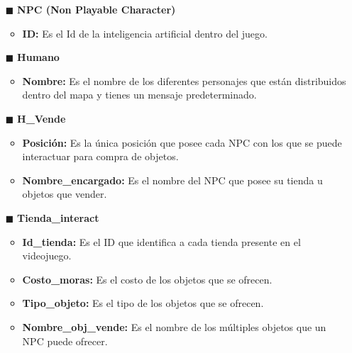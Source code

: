 \documentclass{report}
\begin{document}
\begin{itemize}
    \item[$\blacksquare$]\textbf{NPC (Non Playable Character)}
        \begin{itemize}
            \item \textbf{ID:} Es el Id de la inteligencia artificial dentro del juego.
        \end{itemize}
    \item[$\blacksquare$]\textbf{Humano}   
        \begin{itemize}
            \item \textbf{Nombre:} Es el nombre de los diferentes personajes que están distribuidos dentro del mapa y tienes un mensaje predeterminado.
        \end{itemize}     
    \item[$\blacksquare$]\textbf{H\_Vende} 
        \begin{itemize}
            \item \textbf{Posición:} Es la única posición que posee cada NPC con los que se puede interactuar para compra de objetos.
            \item \textbf{Nombre\_encargado:} Es el nombre del NPC que posee su tienda u objetos que vender.
        \end{itemize}
    \item[$\blacksquare$]\textbf{Tienda\_interact}  
        \begin{itemize}
            \item \textbf{Id\_tienda:} Es el ID que identifica a cada tienda presente en el videojuego.
            \item \textbf{Costo\_moras:} Es el costo de los objetos que se ofrecen.
            \item \textbf{Tipo\_objeto:} Es el tipo de los objetos que se ofrecen.
            \item \textbf{Nombre\_obj\_vende:} Es el nombre de los múltiples objetos que un NPC puede ofrecer.
        \end{itemize}


\end{itemize}
\end{document}
